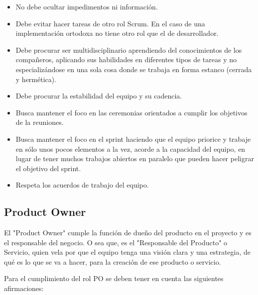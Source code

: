 \begin{itemize}
\item No debe ocultar impedimentos ni información.
\item Debe evitar hacer tareas de otro rol Scrum. En el caso de una implementación ortodoxa no tiene otro rol que el de desarrollador.
\item Debe procurar ser multidisciplinario aprendiendo del conocimientos de los compañeros, aplicando sus habilidades en diferentes tipos de tareas y no especializándose en una sola cosa donde se trabaja en forma estanco (cerrada y hermética).
\item Debe procurar la estabilidad del equipo y su cadencia.
\item Busca mantener el foco en las ceremonias orientados a cumplir los objetivos de la reuniones.
\item Busca mantener el foco en el sprint haciendo que el equipo priorice y trabaje en sólo unos pocos elementos a la vez, acorde a la capacidad del equipo, en lugar de tener muchos trabajos abiertos en paralelo que pueden hacer peligrar el objetivo del sprint.
\item Respeta los acuerdos de trabajo del equipo.
\end{itemize}

\subsection{Product Owner}

El "Product Owner" cumple la función de dueño del producto en el proyecto y es el responsable del negocio. O sea que, es el "Responsable del Producto" o Servicio, quien vela por que el equipo tenga una visión clara y una estrategia, de qué es lo que se va a hacer, para la creación de ese producto o servicio.

Para el cumplimiento del rol PO se deben tener en cuenta las siguientes afirmaciones:

